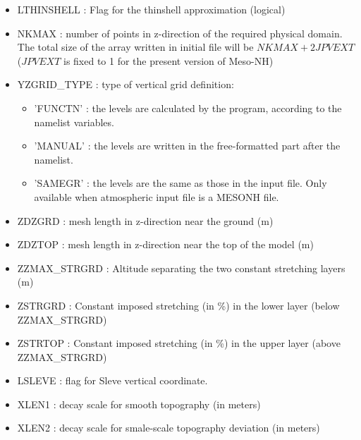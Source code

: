 \begin{itemize}
\item LTHINSHELL : Flag for the thinshell approximation (logical)
\item NKMAX : number of points in z-direction of the required 
              physical domain. The total size of the array written in initial
file will be $NKMAX +2 JPVEXT$ ($JPVEXT$ is fixed to 1 for the present version
 of Meso-NH) 
\item   YZGRID\_TYPE : type of vertical grid definition:
\begin{itemize}
\item 'FUNCTN' : the levels are calculated by the program, according to the
namelist variables.
\item 'MANUAL' : the levels are written in the free-formatted part after the
namelist.
\item 'SAMEGR' : the levels are the same as those in the input file. Only
available when atmospheric input file is a MESONH file.
\end{itemize}
 
\item   ZDZGRD :   mesh length in z-direction near the ground (m)

\item   ZDZTOP :   mesh length in z-direction near the top of the model (m)

\item   ZZMAX\_STRGRD :   Altitude separating the two constant stretching layers  (m)

\item   ZSTRGRD :   Constant imposed stretching (in \%) in the lower layer
(below ZZMAX\_STRGRD)

\item   ZSTRTOP :   Constant imposed stretching (in \%) in the upper layer
(above ZZMAX\_STRGRD)

\item  LSLEVE  : flag for Sleve 
vertical coordinate.
\item  XLEN1  : decay scale for
smooth topography (in meters)
\item  XLEN2  : decay scale for
smale-scale topography deviation (in meters)

\end{itemize}

